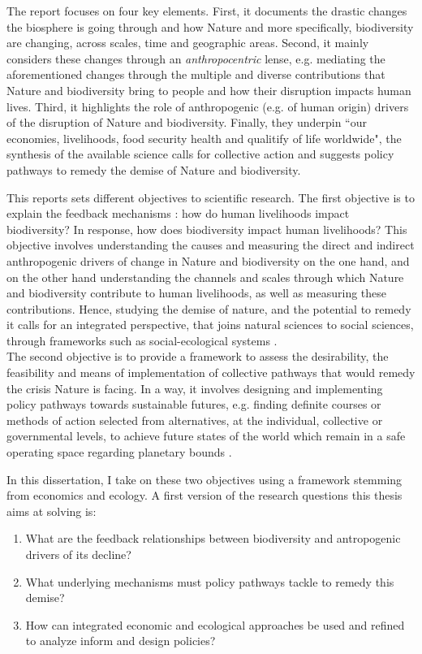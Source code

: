The \cite{ipbes_2022_6417333} report focuses on four key elements. First, it documents the drastic changes the biosphere is going through and how Nature and more specifically, biodiversity  are changing, across scales, time and geographic areas. Second, it mainly considers these changes through an \textit{anthropocentric} lense, e.g. mediating the aforementioned changes through the multiple and diverse contributions that Nature and biodiversity bring to people and how their disruption impacts human lives. Third, it highlights the role of anthropogenic (e.g. of human origin) drivers of the disruption of Nature and biodiversity. Finally, they underpin ``our economies, livelihoods, food security health and qualitify of life worldwide", the synthesis of the available science calls for collective action and suggests policy pathways to remedy the demise of Nature and biodiversity. 
 
This reports sets different objectives to scientific research. The first objective is to explain the feedback mechanisms : how do human livelihoods impact biodiversity? In response, how does biodiversity impact human livelihoods? This objective involves understanding the causes and measuring the direct and indirect anthropogenic drivers of change in Nature and biodiversity on the one hand, and on the other hand understanding the channels and scales through which Nature and biodiversity contribute to human livelihoods, as well as measuring these contributions. Hence, studying the demise of nature, and the potential to remedy it calls for an integrated perspective, that joins natural sciences to social sciences, through frameworks such as social-ecological systems \citep{Ostrom2009}. 
\\
The second objective is to provide a framework to assess the desirability, the feasibility and means of implementation of collective pathways that would remedy the crisis Nature is facing. In a way, it involves designing and implementing policy pathways towards sustainable futures, e.g. finding definite courses or methods of action selected from alternatives, at the individual, collective or governmental levels, to achieve future states of the world which remain in a safe operating space regarding planetary bounds \citep{rockstrom2009safe,steffen_2015_planetary}.

In this dissertation, I take on these two objectives using a framework stemming from economics and ecology. A first version of the research questions this thesis aims at solving is: 
\begin{enumerate}
\setlength{\itemsep}{0pt} %
\item What are the feedback relationships between biodiversity and antropogenic drivers of its decline? 
\item What underlying mechanisms must policy pathways tackle to remedy this demise?
\item  How can integrated economic and ecological approaches be used and refined to analyze inform and design policies? 
\end{enumerate}

